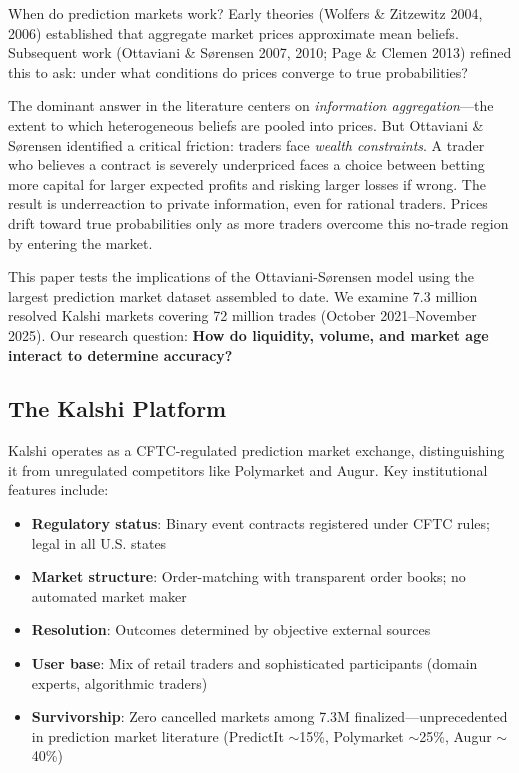 \documentclass[a4paper,11pt]{article}
\theoremstyle{plain}
\theoremstyle{definition}
\begin{document}
When do prediction markets work? Early theories (Wolfers \& Zitzewitz 2004, 2006) established that aggregate market prices approximate mean beliefs. Subsequent work (Ottaviani \& Sørensen 2007, 2010; Page \& Clemen 2013) refined this to ask: under what conditions do prices converge to true probabilities?

The dominant answer in the literature centers on \textit{information aggregation}---the extent to which heterogeneous beliefs are pooled into prices. But Ottaviani \& Sørensen identified a critical friction: traders face \textit{wealth constraints}. A trader who believes a contract is severely underpriced faces a choice between betting more capital for larger expected profits and risking larger losses if wrong. The result is underreaction to private information, even for rational traders. Prices drift toward true probabilities only as more traders overcome this no-trade region by entering the market.

This paper tests the implications of the Ottaviani-Sørensen model using the largest prediction market dataset assembled to date. We examine 7.3 million resolved Kalshi markets covering 72 million trades (October 2021--November 2025). Our research question: \textbf{How do liquidity, volume, and market age interact to determine accuracy?}

\subsection{The Kalshi Platform}

Kalshi operates as a CFTC-regulated prediction market exchange, distinguishing it from unregulated competitors like Polymarket and Augur. Key institutional features include:

\begin{itemize}
\item \textbf{Regulatory status}: Binary event contracts registered under CFTC rules; legal in all U.S. states
\item \textbf{Market structure}: Order-matching with transparent order books; no automated market maker
\item \textbf{Resolution}: Outcomes determined by objective external sources
\item \textbf{User base}: Mix of retail traders and sophisticated participants (domain experts, algorithmic traders)
\item \textbf{Survivorship}: Zero cancelled markets among 7.3M finalized---unprecedented in prediction market literature (PredictIt $\sim$15\%, Polymarket $\sim$25\%, Augur $\sim$40\%)
\end{itemize}
\end{document}
